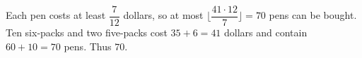 Each pen costs at least $\dfrac{7}{12}$ dollars, so at most $\lfloor\dfrac{41\cdot12}{7}\rfloor=70$ pens can be bought. Ten six-packs and two five-packs cost $35+6=41$ dollars and contain $60+10=70$ pens. Thus $\boxed{70}$.
